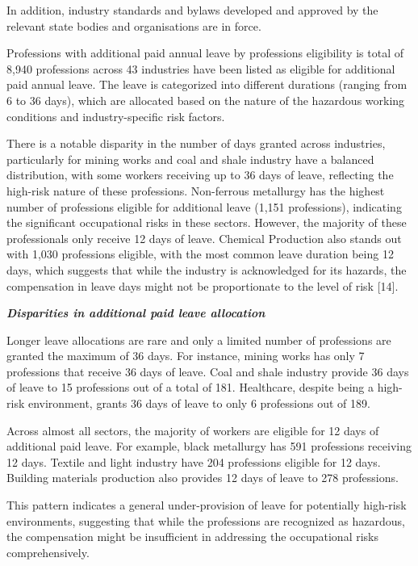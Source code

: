 In addition, industry standards and bylaws developed and approved by the
relevant state bodies and organisations are in force.

Professions with additional paid annual leave by professions eligibility
is total of 8,940 professions across 43 industries have been listed as
eligible for additional paid annual leave. The leave is categorized into
different durations (ranging from 6 to 36 days), which are allocated
based on the nature of the hazardous working conditions and
industry-specific risk factors.

There is a notable disparity in the number of days granted across
industries, particularly for mining works and coal and shale industry
have a balanced distribution, with some workers receiving up to 36 days
of leave, reflecting the high-risk nature of these professions.
Non-ferrous metallurgy has the highest number of professions eligible
for additional leave (1,151 professions), indicating the significant
occupational risks in these sectors. However, the majority of these
professionals only receive 12 days of leave. Chemical Production also
stands out with 1,030 professions eligible, with the most common leave
duration being 12 days, which suggests that while the industry is
acknowledged for its hazards, the compensation in leave days might not
be proportionate to the level of risk {[}14{]}.

\emph{{\bfseries Disparities in additional paid leave allocation}}

Longer leave allocations are rare and only a limited number of
professions are granted the maximum of 36 days. For instance, mining
works has only 7 professions that receive 36 days of leave. Coal and
shale industry provide 36 days of leave to 15 professions out of a total
of 181. Healthcare, despite being a high-risk environment, grants 36
days of leave to only 6 professions out of 189.

Across almost all sectors, the majority of workers are eligible for 12
days of additional paid leave. For example, black metallurgy has 591
professions receiving 12 days. Textile and light industry have 204
professions eligible for 12 days. Building materials production also
provides 12 days of leave to 278 professions.

This pattern indicates a general under-provision of leave for
potentially high-risk environments, suggesting that while the
professions are recognized as hazardous, the compensation might be
insufficient in addressing the occupational risks comprehensively.

